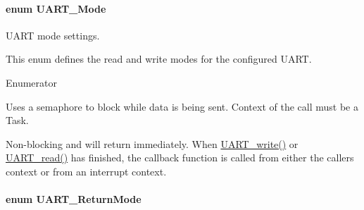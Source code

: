 \paragraph[{U\+A\+R\+T\+\_\+\+Mode}]{\setlength{\rightskip}{0pt plus 5cm}enum {\bf U\+A\+R\+T\+\_\+\+Mode}}\label{_u_a_r_t_8h_a2507a620dba95cd20885c52494d19e90}


U\+A\+R\+T mode settings. 

This enum defines the read and write modes for the configured U\+A\+R\+T. \begin{Desc}
\item[Enumerator]\par
\begin{description}
\item[{\em 
U\+A\+R\+T\+\_\+\+M\+O\+D\+E\+\_\+\+B\+L\+O\+C\+K\+I\+N\+G\label{_u_a_r_t_8h_a2507a620dba95cd20885c52494d19e90ae6b6bd5d2d5df859ad6724e89e605ebf}
}]Uses a semaphore to block while data is being sent. Context of the call must be a Task. \item[{\em 
U\+A\+R\+T\+\_\+\+M\+O\+D\+E\+\_\+\+C\+A\+L\+L\+B\+A\+C\+K\label{_u_a_r_t_8h_a2507a620dba95cd20885c52494d19e90ae0dbd9b5195e56c3c2aed10163523754}
}]Non-\/blocking and will return immediately. When \hyperlink{_u_a_r_t_8h_a6f2a04c09dc17886e69e361cd80aaedc}{U\+A\+R\+T\+\_\+write()} or \hyperlink{_u_a_r_t_8h_a023152d57539cad94bdd813956013e73}{U\+A\+R\+T\+\_\+read()} has finished, the callback function is called from either the caller\textquotesingle{}s context or from an interrupt context. \end{description}
\end{Desc}
\paragraph[{U\+A\+R\+T\+\_\+\+Return\+Mode}]{\setlength{\rightskip}{0pt plus 5cm}enum {\bf U\+A\+R\+T\+\_\+\+Return\+Mode}}\label{_u_a_r_t_8h_acb5a82843435a1b5d51b6c27028d914f}



